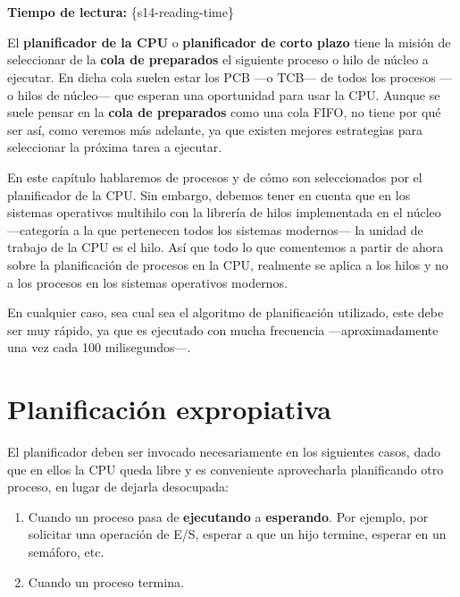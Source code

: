 \section{}

\textbf{Tiempo de lectura:} \{s14-reading-time\}

El \textbf{planificador de la CPU}{} o \textbf{planificador de corto
plazo}{} tiene la misión de seleccionar de la \textbf{cola de
preparados} el siguiente proceso o hilo de núcleo a ejecutar. En dicha
cola suelen estar los PCB ---o TCB--- de todos los procesos ---o hilos
de núcleo--- que esperan una oportunidad para usar la CPU. Aunque se
suele pensar en la \textbf{cola de preparados} como una cola FIFO, no
tiene por qué ser así, como veremos más adelante, ya que existen mejores
estrategias para seleccionar la próxima tarea a ejecutar.

En este capítulo hablaremos de procesos y de cómo son seleccionados por
el planificador de la CPU. Sin embargo, debemos tener en cuenta que en
los sistemas operativos multihilo con la librería de hilos implementada
en el núcleo ---categoría a la que pertenecen todos los sistemas
modernos--- la unidad de trabajo de la CPU es el hilo. Así que todo lo
que comentemos a partir de ahora sobre la planificación de procesos en
la CPU, realmente se aplica a los hilos y no a los procesos en los
sistemas operativos modernos.

En cualquier caso, sea cual sea el algoritmo de planificación utilizado,
este debe ser muy rápido, ya que es ejecutado con mucha frecuencia
---aproximadamente una vez cada 100 milisegundos---.

\section{Planificación
expropiativa}\label{_planificaciuxf3n_expropiativa}

{} El planificador deben ser invocado necesariamente en los siguientes
casos, dado que en ellos la CPU queda libre y es conveniente
aprovecharla planificando otro proceso, en lugar de dejarla desocupada:

\begin{enumerate}
\def\labelenumi{\arabic{enumi}.}
\item
  Cuando un proceso pasa de \textbf{ejecutando} a \textbf{esperando}.
  Por ejemplo, por solicitar una operación de E/S, esperar a que un hijo
  termine, esperar en un semáforo, etc.
\item
  Cuando un proceso termina.
\end{enumerate}


